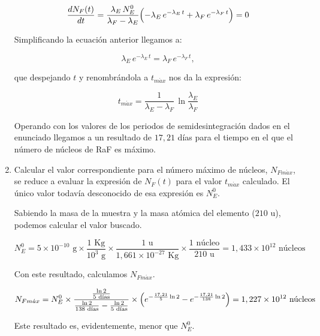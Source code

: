 \begin{enumerate}
    \begin{equation*}
        \frac{d N_F (t)}{dt} = \frac{\lambda_E\, N_E^0}{\lambda_F - \lambda_E}
        \Bigl(
        - \lambda_E \, e^{- \lambda_E\, t}  + \lambda_F \, e^{- \lambda_F\, t}
        \Bigr)  = 0
    \end{equation*}

    Simplificando la ecuación anterior llegamos a:

    \begin{equation*}
        \lambda_E \, e^{- \lambda_E\, t} = \lambda_F \, e^{- \lambda_F\, t},
    \end{equation*}

    que despejando $t$ y renombrándola a $t_{m\acute{a}x}$ nos da la expresión:

    \begin{equation*}
        t_{m\acute{a}x} = \frac{1}{ \lambda_E -  \lambda_F }\, \ln{\frac{\lambda_E}{\lambda_F}}
    \end{equation*}

    Operando con los valores de los periodos de semidesintegración dados en el enunciado llegamos a un resultado de $17,21$ días para el
    tiempo en el que el número de núcleos de RaF es máximo.


    \vspace{20px}

    \item Calcular el valor correspondiente para el número máximo de núcleos, $N_{Fm\acute{a}x}$, se reduce a evaluar la expresión de $N_F(t)$
    para el valor $ t_{m\acute{a}x} $ calculado.
    El único valor todavía desconocido de esa expresión es $N_E^0$.

    Sabiendo la masa de la muestra y la masa atómica del elemento ($210 $ u), podemos calcular el valor buscado.

    \begin{equation*}
        N_E^0 = 5 \times 10 ^{-10} \text{ g} \times
        \frac{1 \text{ Kg}}{10^3\text{ g}} \times
        \frac{1 \text{ u}}{1,661 \times 10^{-27}\text{ Kg}} \times
        \frac{1 \text{ núcleo}}{210 \text{ u}} = 1,433 \times 10^{12} \text{ núcleos}
    \end{equation*}

    Con este resultado, calculamos $N_{Fm\acute{a}x}$.

    \begin{equation*}
        N_{Fm\acute{a}x} = N_E^0 \times \frac{\frac{\ln{2}}{5 \text{ días}}}{\frac{\ln{2}}{138 \text{ días}} - \frac{\ln{2}}{5 \text{ días}}} \times
        \Bigl(
        e^{-   \frac{17,21}{5} \ln2} - e^{-\frac{17,21}{138} \ln2}
        \Bigr)  = 1,227 \times 10 ^{12} \text{ núcleos}
    \end{equation*}

    Este resultado es, evidentemente, menor que $N_E^0$.

\end{enumerate}


